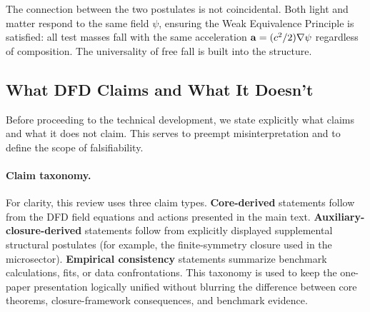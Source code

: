 The connection between the two postulates is not coincidental. Both light 
and matter respond to the same field $\psi$, ensuring the Weak Equivalence 
Principle is satisfied: all test masses fall with the same acceleration 
$\mathbf{a} = (c^2/2)\nabla\psi$ regardless of composition. The universality of 
free fall is built into the structure.

\subsection{What DFD Claims and What It Doesn't}\label{sec:claims}

Before proceeding to the technical development, we state explicitly what 
\DFD claims and what it does not claim. This serves to preempt misinterpretation 
and to define the scope of falsifiability.

\paragraph{Claim taxonomy.}
For clarity, this review uses three claim types.  \textbf{Core-derived} statements follow from the DFD field equations and actions presented in the main text.  \textbf{Auxiliary-closure-derived} statements follow from explicitly displayed supplemental structural postulates (for example, the finite-symmetry closure used in the microsector).  \textbf{Empirical consistency} statements summarize benchmark calculations, fits, or data confrontations.  This taxonomy is used to keep the one-paper presentation logically unified without blurring the difference between core theorems, closure-framework consequences, and benchmark evidence.

